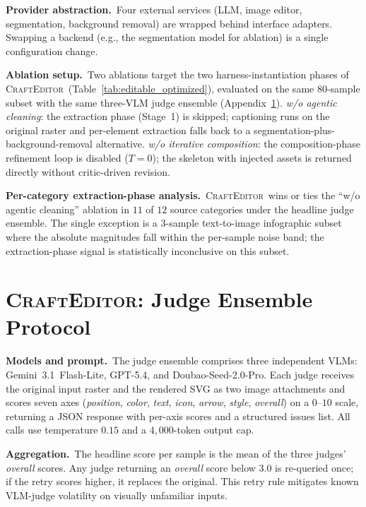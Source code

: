 \documentclass{llmxive}
\providecommand{\Editor}{\textsc{CraftEditor}\xspace}
\begin{document}
\noindent\textbf{Provider abstraction.}\ 
Four external services (LLM, image editor, segmentation, background
removal) are wrapped behind interface adapters.
Swapping a backend (e.g., the segmentation model for ablation) is a
single configuration change.

\noindent\textbf{Ablation setup.}\ 
Two ablations target the two harness-instantiation phases of
\Editor\ (Table~\ref{tab:editable_optimized}), evaluated on the
same $80$-sample subset with the same three-VLM judge ensemble
(Appendix~\ref{app:editor-judge}).
\emph{w/o agentic cleaning}: the extraction phase (Stage~1) is
skipped; captioning runs on the original raster and per-element
extraction falls back to a segmentation-plus-background-removal
alternative.
\emph{w/o iterative composition}: the composition-phase refinement
loop is disabled ($T{=}0$); the skeleton with injected assets is
returned directly without critic-driven revision.

\noindent\textbf{Per-category extraction-phase analysis.}\ 
\Editor\ wins or ties the ``w/o agentic cleaning'' ablation in $11$
of $12$ source categories under the headline judge ensemble.
The single exception is a $3$-sample text-to-image infographic
subset where the absolute magnitudes fall within the per-sample
noise band; the extraction-phase signal is statistically
inconclusive on this subset.
\section{\Editor: Judge Ensemble Protocol}
\label{app:editor-judge}

\noindent\textbf{Models and prompt.}\
The judge ensemble comprises three independent VLMs: Gemini~3.1~Flash-Lite, GPT-5.4, and Doubao-Seed-2.0-Pro. Each judge receives the original input raster and the rendered SVG as two image attachments and scores seven axes (\emph{position}, \emph{color}, \emph{text}, \emph{icon}, \emph{arrow}, \emph{style}, \emph{overall}) on a $0$--$10$ scale, returning a JSON response with per-axis scores and a structured issues list. All calls use temperature $0.15$ and a $4{,}000$-token output cap.

\noindent\textbf{Aggregation.}\
The headline score per sample is the mean of the three judges' \emph{overall} scores. Any judge returning an \emph{overall} score below $3.0$ is re-queried once; if the retry scores higher, it replaces the original. This retry rule mitigates known VLM-judge volatility on visually unfamiliar inputs.
\end{document}
